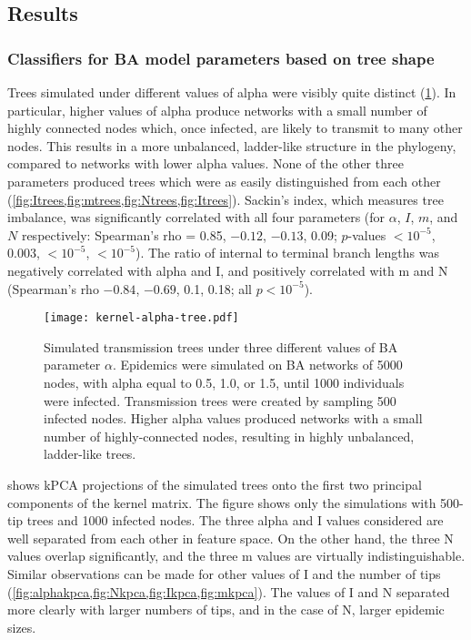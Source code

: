 \subsection{Results}

\subsubsection*{Classifiers for BA model parameters based on tree shape}



Trees simulated under different values of \gls{alpha} were visibly quite
distinct (\cref{fig:alphatrees}). In particular, higher values of \gls{alpha}
produce networks with a small number of highly connected nodes which, once
infected, are likely to transmit to many other nodes. This results in a more
unbalanced, ladder-like structure in the phylogeny, compared to networks with
lower \gls{alpha} values. None of the other three parameters produced trees
which were as easily distinguished from each other
(\cref{fig:Itrees,fig:mtrees,fig:Ntrees,fig:Itrees}).  Sackin's index, which
measures tree imbalance, was significantly correlated with all four parameters
    (for $\alpha$, $I$, $m$, and $N$ respectively: Spearman's rho =
     0.85,
     \ensuremath{-0.12},
     \ensuremath{-0.13},
     0.09;
     $p$-values
     ${<}10^{-5}$,
     $0.003$,
     ${<}10^{-5}$,
     ${<}10^{-5}$).
The ratio of internal to terminal branch lengths was negatively correlated with
\gls{alpha} and \gls{I}, and positively correlated with \gls{m} and \gls{N}
  (Spearman's rho
    \ensuremath{-0.84},
    \ensuremath{-0.69},
    0.1,
    0.18;
  all $p < 10^{-5}$).

\begin{figure}[ht]
  \centering
  \texttt{[image: kernel-alpha-tree.pdf]}
  \caption[Simulated transmission trees under three different values of BA parameter $\alpha$]{
    Simulated transmission trees under three different values of BA parameter
    $\alpha$. Epidemics were simulated on \gls{BA} networks of 5000 nodes, with
    \gls{alpha} equal to 0.5, 1.0, or 1.5, until 1000 individuals were
    infected. Transmission trees were created by sampling 500 infected nodes.
    Higher \gls{alpha} values produced networks with a small number of
    highly-connected nodes, resulting in highly unbalanced, ladder-like trees.
  }
  \label{fig:alphatrees}
\end{figure}

 shows \gls{kPCA} projections of the simulated trees onto the
first two principal components of the kernel matrix. The figure shows only the
simulations with 500-tip trees and 1000 infected nodes. The three \gls{alpha}
and \gls{I} values considered are well separated from each other in feature
space. On the other hand, the three \gls{N} values overlap significantly, and
the three \gls{m} values are virtually indistinguishable. Similar observations
can be made for other values of \gls{I} and the number of tips
(\cref{fig:alphakpca,fig:Nkpca,fig:Ikpca,fig:mkpca}). The values of \gls{I} and
\gls{N} separated more clearly with larger numbers of tips, and in the case of
\gls{N}, larger epidemic sizes.

